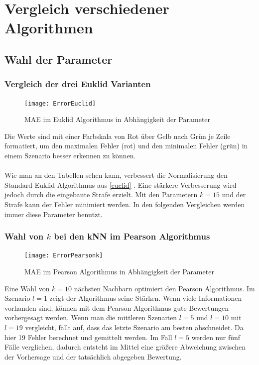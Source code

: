 \section{Vergleich verschiedener Algorithmen}\label{s.Ergebnisse}\raggedbottom

\subsection{Wahl der Parameter}

\subsubsection{Vergleich der drei Euklid Varianten}\label{s.keuclid}
\begin{figure}[h!]
	\centering
	\texttt{[image: ErrorEuclid]}
	\caption{MAE im Euklid Algorithmus in Abhängigkeit der Parameter}
	\label{fig:ErrorEuclid}
	
\end{figure}
Die Werte sind mit einer Farbskala von Rot über Gelb nach Grün je Zeile formatiert, um den maximalen Fehler (rot) und den minimalen Fehler (grün) in einem Szenario besser erkennen zu können.\\\\
Wie man an den Tabellen sehen kann, verbessert die Normalisierung den Standard-Euklid-Algorithmus aus \autoref{euclid} . Eine stärkere Verbesserung wird jedoch durch die eingebaute Strafe erzielt. Mit den Parametern $k = 15$ und der Strafe kann der Fehler minimiert werden. In den folgenden Vergleichen werden immer diese Parameter benutzt.
\clearpage

\subsubsection{Wahl von $k$ bei den kNN im Pearson Algorithmus}\label{s.kpearson}
\begin{figure}[h!]
\centering
\texttt{[image: ErrorPearsonk]}
\caption{MAE im Pearson Algorithmus in Abhängigkeit der Parameter }
\label{fig:ErrorPearsonk}
\end{figure}
Eine Wahl von $k = 10$ nächsten Nachbarn optimiert den Pearson Algorithmus. Im Szenario $l = 1$ zeigt der Algorithmus seine Stärken. Wenn viele Informationen vorhanden sind, können mit dem Pearson Algorithmus gute Bewertungen vorhergesagt werden. Wenn man die mittleren Szenarien $l = 5$ und $l = 10$ mit $l = 19$ vergleicht, fällt auf, dass das letzte Szenario am besten abschneidet. Da hier 19 Fehler berechnet und gemittelt werden. Im Fall $l = 5$ werden nur fünf Fälle verglichen, dadurch entsteht im Mittel eine größere Abweichung zwischen der Vorhersage und der tatsächlich abgegeben Bewertung.
\clearpage

